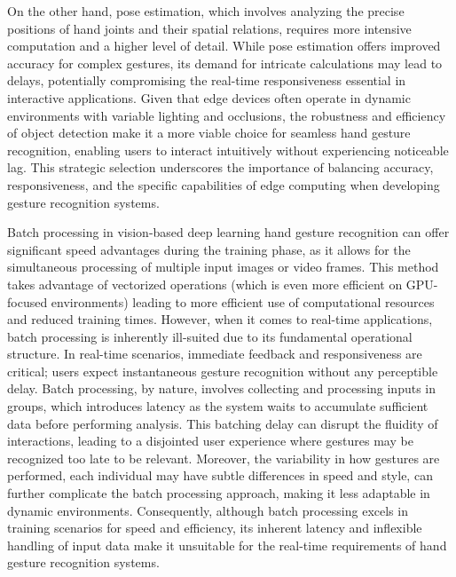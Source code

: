 \documentclass[12pt]{article}
\begin{document}
On the other hand, pose estimation, which involves analyzing the precise positions of hand joints and their spatial relations, requires more intensive computation and a higher level of detail. While pose estimation offers improved accuracy for complex gestures, its demand for intricate calculations may lead to delays, potentially compromising the real-time responsiveness essential in interactive applications. Given that edge devices often operate in dynamic environments with variable lighting and occlusions, the robustness and efficiency of object detection make it a more viable choice for seamless hand gesture recognition, enabling users to interact intuitively without experiencing noticeable lag. This strategic selection underscores the importance of balancing accuracy, responsiveness, and the specific capabilities of edge computing when developing gesture recognition systems.

Batch processing in vision-based deep learning hand gesture recognition can offer significant speed advantages during the training phase, as it allows for the simultaneous processing of multiple input images or video frames. This method takes advantage of vectorized operations (which is even more efficient on GPU-focused environments) leading to more efficient use of computational resources and reduced training times. However, when it comes to real-time applications, batch processing is inherently ill-suited due to its fundamental operational structure. In real-time scenarios, immediate feedback and responsiveness are critical; users expect instantaneous gesture recognition without any perceptible delay. Batch processing, by nature, involves collecting and processing inputs in groups, which introduces latency as the system waits to accumulate sufficient data before performing analysis. This batching delay can disrupt the fluidity of interactions, leading to a disjointed user experience where gestures may be recognized too late to be relevant. Moreover, the variability in how gestures are performed, each individual may have subtle differences in speed and style, can further complicate the batch processing approach, making it less adaptable in dynamic environments. Consequently, although batch processing excels in training scenarios for speed and efficiency, its inherent latency and inflexible handling of input data make it unsuitable for the real-time requirements of hand gesture recognition systems.
\end{document}
